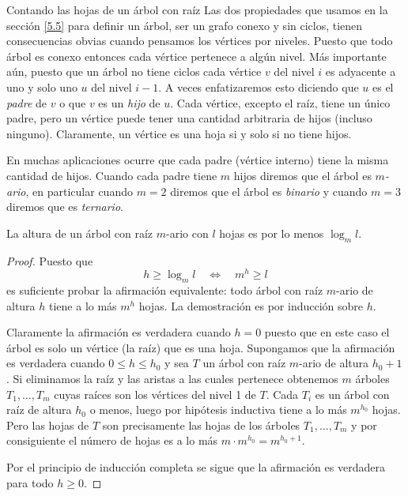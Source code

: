 \begin{section}{Contando las hojas de un árbol con raíz}
Las dos propiedades que usamos en la sección \ref{5.5} para definir un árbol, ser un grafo conexo y sin ciclos, tienen consecuencias obvias cuando pensamos los vértices por niveles. Puesto que todo árbol es conexo entonces cada vértice pertenece a algún nivel. Más importante aún, puesto que un árbol no tiene ciclos  cada
vértice $v$ del nivel $i$ es adyacente a uno y solo uno $u$ del nivel $i-1$. A veces enfatizaremos esto diciendo que $u$ es el \textit{{padre}} de $v$ o que $v$ es un \textit{{hijo}} de $u$. Cada    vértice, excepto el raíz, tiene un único padre, pero un vértice puede tener una cantidad arbitraria de hijos (incluso ninguno). Claramente, un vértice es una hoja si y solo si no tiene hijos.

En muchas aplicaciones ocurre que cada padre (vértice interno) tiene la misma cantidad de hijos. Cuando cada padre tiene $m$ hijos diremos que el árbol es \textit{$m$-ario}, en particular cuando $m=2$ diremos que el árbol es \textit{binario}     y cuando $m=3$ diremos que es \textit{ternario}.

\begin{teorema}\label{t6.1} La altura de un árbol con raíz $m$-ario con $l$ hojas es por lo menos $\log_ml$.
\end{teorema}
\begin{proof} Puesto que
$$
h \ge \log_ml \quad \Leftrightarrow \quad m^h \ge l
$$
es suficiente probar la afirmación equivalente: todo árbol con raíz $m$-ario de altura $h$ tiene a lo más $m^h$ hojas. La demostración es por inducción sobre $h$.

Claramente la afirmación es verdadera cuando $h=0$ puesto que en este caso el árbol es solo un vértice (la raíz) que es una hoja. Supongamos que la afirmación es verdadera cuando $0\le h \le h_0$ y sea $T$ un árbol con raíz $m$-ario de altura $h_0+1$. Si eliminamos la raíz y las aristas a las cuales pertenece obtenemos $m$ árboles $T_1,\ldots,T_m$ cuyas raíces son los vértices del nivel 1 de $T$. Cada $T_i$ es un árbol con raíz de altura $h_0$ o menos, luego por hipótesis inductiva tiene a lo más $m^{h_0}$ hojas. Pero las hojas de $T$ son precisamente las hojas de los árboles $T_1,\ldots,T_m$ y por consiguiente el número de hojas es a lo más $m \cdot m^{h_0}= m^{h_0+1}$.

Por el principio de inducción completa se sigue que la afirmación es verdadera para todo $h\ge 0$.
\end{proof}


\end{section}
